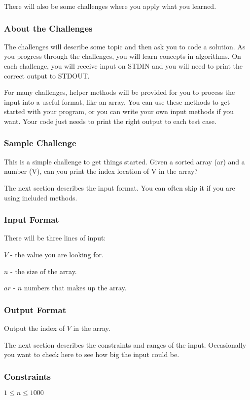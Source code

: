 There will also be some challenges where you apply what you learned.


\subsubsection{About the Challenges}
The challenges will describe some topic and then ask you to code a solution. As you progress through the challenges, you will learn concepts in algorithms. On each challenge, you will receive input on STDIN and you will need to print the correct output to STDOUT.

For many challenges, helper methods will be provided for you to process the input into a useful format, like an array. You can use these methods to get started with your program, or you can write your own input methods if you want. Your code just needs to print the right output to each test case.


\subsubsection{Sample Challenge}
This is a simple challenge to get things started. Given a sorted array (ar) and a number (V), can you print the index location of V in the array?

{The next section describes the input format. You can often skip it if you are using included methods. }


\subsubsection{Input Format}
There will be three lines of input:
\begindot
\item $V$ - the value you are looking for.
\item $n$ - the size of the array.
\item $ar$ - $n$ numbers that makes up the array.
\myenddot


\subsubsection{Output Format}
Output the index of $V$ in the array.

{The next section describes the constraints and ranges of the input. Occasionally you want to check here to see how big the input could be. }


\subsubsection{Constraints}
$1 \leq n \leq 1000$

